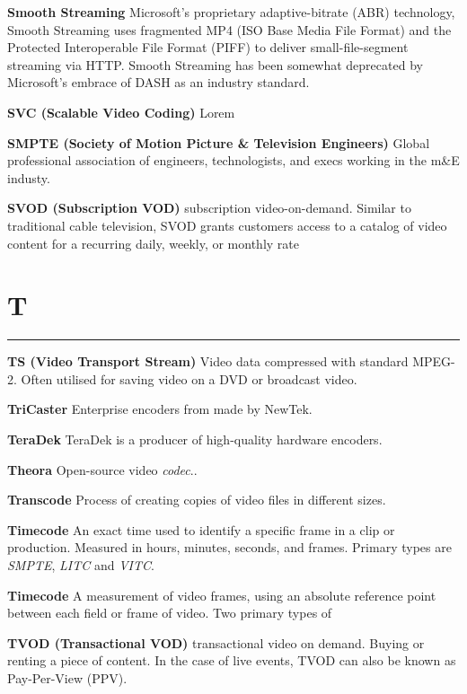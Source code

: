 \smallskip
\textbf{Smooth Streaming}
Microsoft’s proprietary adaptive-bitrate (ABR) technology, Smooth Streaming uses fragmented MP4 (ISO Base Media File Format) and the Protected Interoperable File Format (PIFF) to deliver small-file-segment streaming via HTTP. Smooth Streaming has been somewhat deprecated by Microsoft’s embrace of DASH as an industry standard.

\smallskip
\textbf{SVC (Scalable Video Coding)}
Lorem

\smallskip
\textbf{SMPTE (Society of Motion Picture \& Television Engineers)}
Global professional association of engineers, technologists, and execs working in the m\&E industy.

\smallskip
\textbf{SVOD (Subscription VOD)}
subscription video-on-demand. Similar to traditional cable television, SVOD grants customers access to a catalog of video content for a recurring daily, weekly, or monthly rate


\section{T}
\hrule

\medskip
\textbf{TS (Video Transport Stream)}
Video data compressed with standard MPEG-2. Often utilised for saving video on a DVD or broadcast video.


\smallskip
\textbf{TriCaster}
Enterprise encoders from made by NewTek.

\smallskip
\textbf{TeraDek}
TeraDek is a producer of high-quality hardware encoders.


\smallskip
\textbf{Theora}
Open-source video \textit{codec}..

\smallskip
\textbf{Transcode}
Process of creating copies of video files in different sizes.

\smallskip
\textbf{Timecode}
An exact time used to identify a specific frame in a clip or production. Measured in hours, minutes, seconds, and frames. Primary types are \textit{SMPTE}, \textit{LITC} and \textit{VITC}.

\smallskip
\textbf{Timecode}
A measurement of video frames, using an absolute reference point between each field or frame of video. Two primary types of

\smallskip
\textbf{TVOD (Transactional VOD)}
transactional video on demand. Buying or renting a piece of content. In the case of live events, TVOD can also be known as Pay-Per-View (PPV).


